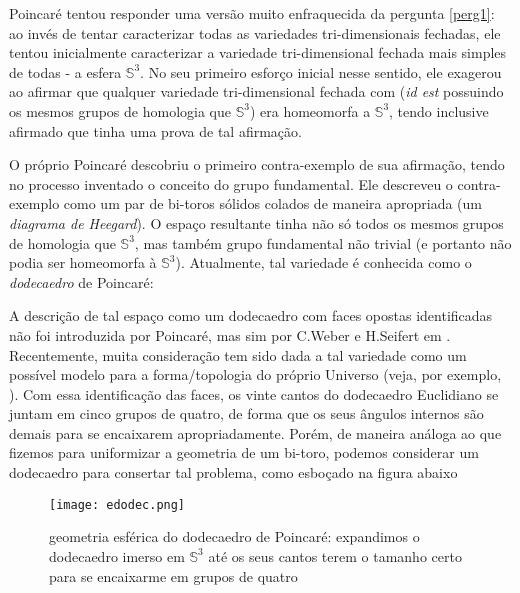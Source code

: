 Poincaré tentou responder uma versão muito enfraquecida da pergunta \cref{perg1}: ao invés de tentar caracterizar todas as variedades tri-dimensionais fechadas, ele tentou inicialmente caracterizar a variedade tri-dimensional fechada mais simples de todas - a esfera $\mathbb{S}^3$. No seu primeiro esforço inicial nesse sentido, ele exagerou ao afirmar que qualquer variedade tri-dimensional fechada com  (\emph{id est} possuindo os mesmos grupos de homologia que $\mathbb{S}^3$) era homeomorfa a $\mathbb{S}^3$, tendo inclusive afirmado que tinha uma prova de tal afirmação. \par 
O próprio Poincaré descobriu o primeiro contra-exemplo de sua afirmação, tendo no processo inventado o conceito do grupo fundamental.  Ele descreveu o contra-exemplo como um par de bi-toros sólidos colados de maneira apropriada (um \emph{diagrama de Heegard}). O espaço resultante tinha não só todos os mesmos grupos de homologia que $\mathbb{S}^3$, mas também grupo fundamental não trivial (e portanto não podia ser homeomorfa à $\mathbb{S}^3$). Atualmente, tal variedade é conhecida como o \emph{dodecaedro} de Poincaré: 
\iffalse
\begin{figure}[H]
\centering
\texttt{[image: dodec.png]}
\caption{visualização do dodecaedro de Poincaré - cole faces opostas após um décimo de volta no sentido anti-horário $\left(\text{rotação por $\frac{2 \pi}{10} = \frac{\pi}{5}$ radianos} \right)$}
\end{figure}
\fi
A descrição de tal espaço como um dodecaedro com faces opostas identificadas não foi introduzida por Poincaré, mas sim por C.Weber e H.Seifert em . Recentemente, muita consideração tem sido dada a tal variedade como um possível modelo para a forma/topologia do próprio Universo (veja, por exemplo, ). Com essa identificação das faces, os vinte cantos do dodecaedro Euclidiano se juntam em cinco grupos de quatro, de forma que os seus ângulos internos são  demais para se encaixarem apropriadamente. Porém, de maneira análoga ao que fizemos para uniformizar a geometria de um bi-toro, podemos considerar um dodecaedro  para consertar tal problema, como esboçado na figura abaixo
\iffalse
\begin{figure}[H]
\centering
\texttt{[image: edodec.png]}
\caption{geometria esférica do dodecaedro de Poincaré: expandimos o dodecaedro imerso em $\mathbb{S}^3$ até os seus cantos terem o tamanho certo para se encaixarme em grupos de quatro}
\end{figure}

